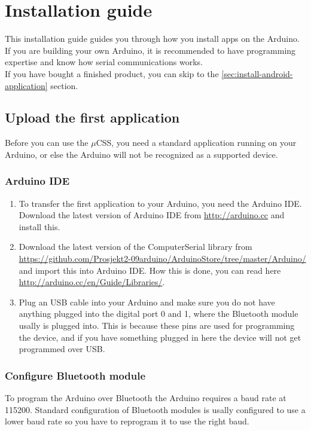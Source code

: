 \chapter{Installation guide}
This installation guide guides you through how you install apps on the Arduino. If you are building your own Arduino, it is recommended to have programming expertise and know how serial communications works.\\

If you have bought a finished product, you can skip to the \ref{sec:install-android-application} section.

	\section{Upload the first application}
	Before you can use the $\mu$CSS, you need a standard application running on your Arduino, or else the Arduino will not be recognized as a supported device.
	
		\subsection{Arduino IDE}
		\begin{enumerate}
		\item To transfer the first application to your Arduino, you need the Arduino IDE. Download the latest version of Arduino IDE from \url{http://arduino.cc} and install this.
	
		\item Download the latest version of the ComputerSerial library from \url{https://github.com/Prosjekt2-09arduino/ArduinoStore/tree/master/Arduino/} and import this into Arduino IDE. How this is done, you can read here \url{http://arduino.cc/en/Guide/Libraries/}.
	
		\item Plug an USB cable into your Arduino and make sure you do not have anything plugged into the digital port 0 and 1, where the Bluetooth module usally is plugged into. This is because these pins are used for programming the device, and if you have something plugged in here the device will not get programmed over USB.
		\end{enumerate}
		
				
		\subsection{Configure Bluetooth module}
		To program the Arduino over Bluetooth the Arduino requires a baud rate at 115200. Standard configuration of Bluetooth modules is usally configured to use a lower baud rate so you have to reprogram it to use the right baud.\\
		
